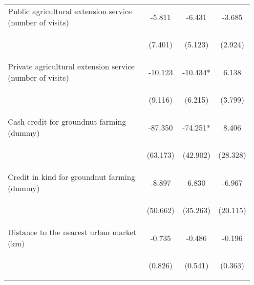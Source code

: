 \begin{center}
\begin{tabular}{lccc}
Public agricultural extension service (number of visits) & -5.811 & -6.431 & -3.685 \\
\vspace{4pt} & \begin{footnotesize}(7.401)\end{footnotesize} & \begin{footnotesize}(5.123)\end{footnotesize} & \begin{footnotesize}(2.924)\end{footnotesize} \\
Private agricultural extension service (number of visits) & -10.123 & -10.434* & 6.138 \\
\vspace{4pt} & \begin{footnotesize}(9.116)\end{footnotesize} & \begin{footnotesize}(6.215)\end{footnotesize} & \begin{footnotesize}(3.799)\end{footnotesize} \\
Cash credit for groundnut farming (dummy) & -87.350 & -74.251* & 8.406 \\
\vspace{4pt} & \begin{footnotesize}(63.173)\end{footnotesize} & \begin{footnotesize}(42.902)\end{footnotesize} & \begin{footnotesize}(28.328)\end{footnotesize} \\
Credit in kind for groundnut farming (dummy) & -8.897 & 6.830 & -6.967 \\
\vspace{4pt} & \begin{footnotesize}(50.662)\end{footnotesize} & \begin{footnotesize}(35.263)\end{footnotesize} & \begin{footnotesize}(20.115)\end{footnotesize} \\
Distance to the nearest urban market (km) & -0.735 & -0.486 & -0.196 \\
\vspace{4pt} & \begin{footnotesize}(0.826)\end{footnotesize} & \begin{footnotesize}(0.541)\end{footnotesize} & \begin{footnotesize}(0.363)\end{footnotesize} \\

\end{tabular}
\end{center}
